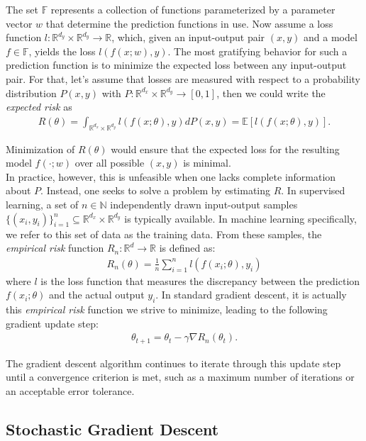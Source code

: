 The set \(\mathbb{F}\) represents a collection of functions parameterized by a parameter vector \( w \) that determine the prediction functions in use.
Now assume a loss function \( l : \mathbb{R}^{d_y} \times \mathbb{R}^{d_y} \to \mathbb{R} \), which, given an input-output pair \((x, y)\) and a model $f \in \mathbb{F}$, yields the loss \( l(f(x; w), y) \).
The most gratifying behavior for such a prediction function is to minimize the expected loss between any input-output pair.
For that, let's assume that losses are measured with respect to a probability distribution $P(x,y)$ with $ P : \mathbb{R}^{d_x} \times \mathbb{R}^{d_y} \to [0, 1] $,
then we could write the \emph{expected risk} as
\begin{align}
R(\theta) = \int_{\mathbb{R}^{d_x} \times \mathbb{R}^{d_y}} l(f(x; \theta), y) dP(x, y) = \mathbb{E}[l(f(x; \theta), y)].
\end{align}

Minimization of $R(\theta)$ would ensure that the expected loss for the resulting model $f(\cdot; w) $ over all possible $(x, y)$ is minimal.\\
In practice, however, this is unfeasible when one lacks complete information about $P$.
Instead, one seeks to solve a problem by estimating \( R \).
In supervised learning, a set of \( n \in \mathbb{N} \) independently drawn input-output
samples \(\{ (x_i, y_i) \}_{i=1}^{n} \subseteq \mathbb{R}^{d_x} \times \mathbb{R}^{d_y}\) is typically available.
In machine learning specifically, we refer to this set of data as the training data.
From these samples, the \emph{empirical risk} function \( R_n : \mathbb{R}^d \to \mathbb{R} \) is defined as:
\begin{align}
R_n(\theta) = \frac{1}{n} \sum_{i=1}^{n} l(f(x_i; \theta), y_i)
\end{align}
where \( l \) is the loss function that measures the discrepancy between the prediction \( f(x_i; \theta) \) and the actual output \( y_i \).
In standard gradient descent, it is actually this \emph{empirical risk} function we strive to minimize, leading to the following gradient update step:
\begin{align}
    \theta_{t+1} = \theta_t - \gamma \nabla R_n(\theta_t).
\end{align}

The gradient descent algorithm continues to iterate through this update step until a convergence criterion is met, such as a maximum number of iterations or an acceptable error tolerance.
\subsection{Stochastic Gradient Descent \cite{stanfordSGD}}
\label{sec:sgd}



